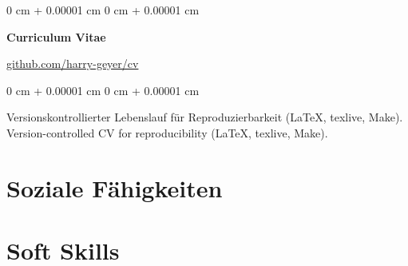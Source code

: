 \documentclass[10pt, letterpaper]{article}
\newenvironment{onecolentry}{
    \begin{adjustwidth}{
        0 cm + 0.00001 cm
    }{
        0 cm + 0.00001 cm
    }
}{
    \end{adjustwidth}
}
\newenvironment{twocolentry}[2][]{
    \onecolentry
    \def\secondColumn{#2}
    \setcolumnwidth{\fill, 4.75 cm}
    \begin{paracol}{2}
}{
    \switchcolumn \raggedleft \secondColumn
    \end{paracol}
    \endonecolentry
}
\begin{document}
        \vspace{0.2 cm}

        \begin{twocolentry}{\href{https://github.com/harry-geyer/cv}{github.com/harry-geyer/cv}}
            \textbf{Curriculum Vitae}
        \end{twocolentry}

        \vspace{0.10 cm}
        \begin{onecolentry}
            \ifdefined\german
            Versionskontrollierter Lebenslauf für Reproduzierbarkeit (LaTeX, texlive, Make).
            \else
            Version-controlled CV for reproducibility (LaTeX, texlive, Make).
            \fi
        \end{onecolentry}

        \vspace{0.15 cm}

    \ifdefined\german
    \section{Soziale Fähigkeiten}
    \else
    \section{Soft Skills}
    \fi
\end{document}
